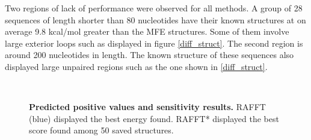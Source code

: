 \documentclass[a4paper,12pt]{article}
\begin{document}
{{Two regions of lack of performance were observed for all methods. A group of 28
sequences of length shorter than 80 nucleotides have their known structures at
on average 9.8 kcal/mol greater than the MFE structures. Some of them involve
large exterior loops such as displayed in figure \ref{diff_struct}. The second
region is around 200 nucleotides in length. The known structure of these
sequences also displayed large unpaired regions such as the one shown in
\ref{diff_struct}.

\begin{figure}[!ht]
  \centering
  \\
  \caption{\textbf{Predicted positive values and sensitivity results\label{perf_fig}.}
  RAFFT (blue) displayed the best energy found. RAFFT* displayed the best score found among 50 saved structures.}
\end{figure}

}}
\end{document}

